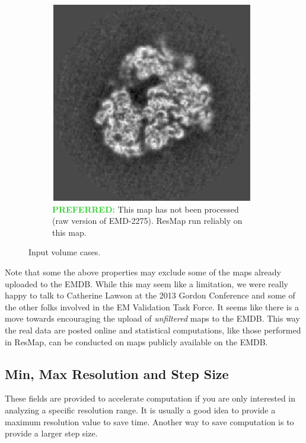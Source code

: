 \documentclass[10pt]{article}
\begin{document}
\begin{figure}[!ht]
\begin{subfigure}[b]{0.4\textwidth}
	        \includegraphics[width=\textwidth]{img/3_sjors.png}
	        \caption{\textcolor{LimeGreen}{\textbf{PREFERRED:}} This map has not been processed (raw version of EMD-2275). ResMap run reliably on this map. \newline}
	\end{subfigure}
	\caption{Input volume cases.}
	\label{fig:inputs}
\end{figure}

Note that some the above properties may exclude some of the maps already uploaded to the EMDB. While this may seem like a limitation, we were really happy to talk to Catherine Lawson at the 2013 Gordon Conference and some of the other folks involved in the EM Validation Task Force. It seems like there is a move towards encouraging the upload of \emph{unfiltered} maps to the EMDB. This way the real data are posted online and statistical computations, like those performed in ResMap, can be conducted on maps publicly available on the EMDB.

\subsection{Min, Max Resolution and Step Size}
These fields are provided to accelerate computation if you are only interested in analyzing a specific resolution range. It is usually a good idea to provide a maximum resolution value to save time. Another way to save computation is to provide a larger step size.
\end{document}
